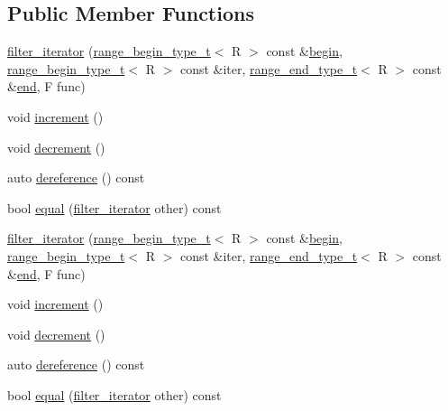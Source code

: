 \subsection*{Public Member Functions}
\begin{DoxyCompactItemize}
\item 
\mbox{\hyperlink{structrah_1_1view_1_1filter__iterator_a31543c024a816c4f3e8fc8937b2a9214}{filter\+\_\+iterator}} (\mbox{\hyperlink{namespacerah_a28aff4eeddcece6be65ff0b956d32d4a}{range\+\_\+begin\+\_\+type\+\_\+t}}$<$ R $>$ const \&\mbox{\hyperlink{namespacerah_a2c4a19e57cc4e0753e93830f247def6d}{begin}}, \mbox{\hyperlink{namespacerah_a28aff4eeddcece6be65ff0b956d32d4a}{range\+\_\+begin\+\_\+type\+\_\+t}}$<$ R $>$ const \&iter, \mbox{\hyperlink{namespacerah_a9657e24ae477f4482225b133fe286b65}{range\+\_\+end\+\_\+type\+\_\+t}}$<$ R $>$ const \&\mbox{\hyperlink{namespacerah_aaddd1442cd76b96876e692cdefe7261d}{end}}, F func)
\item 
void \mbox{\hyperlink{structrah_1_1view_1_1filter__iterator_a63278a452be5e546e6fb3aa0b1a90bfb}{increment}} ()
\item 
void \mbox{\hyperlink{structrah_1_1view_1_1filter__iterator_aed445498ffbec0c3e782ddc17314b677}{decrement}} ()
\item 
auto \mbox{\hyperlink{structrah_1_1view_1_1filter__iterator_a04ce8bb8bb607b986e692f8e39bed6e3}{dereference}} () const
\item 
bool \mbox{\hyperlink{structrah_1_1view_1_1filter__iterator_a4ab0c322842146d3011ae7c88deb82f7}{equal}} (\mbox{\hyperlink{structrah_1_1view_1_1filter__iterator}{filter\+\_\+iterator}} other) const
\item 
\mbox{\hyperlink{structrah_1_1view_1_1filter__iterator_a31543c024a816c4f3e8fc8937b2a9214}{filter\+\_\+iterator}} (\mbox{\hyperlink{namespacerah_a28aff4eeddcece6be65ff0b956d32d4a}{range\+\_\+begin\+\_\+type\+\_\+t}}$<$ R $>$ const \&\mbox{\hyperlink{namespacerah_a2c4a19e57cc4e0753e93830f247def6d}{begin}}, \mbox{\hyperlink{namespacerah_a28aff4eeddcece6be65ff0b956d32d4a}{range\+\_\+begin\+\_\+type\+\_\+t}}$<$ R $>$ const \&iter, \mbox{\hyperlink{namespacerah_a9657e24ae477f4482225b133fe286b65}{range\+\_\+end\+\_\+type\+\_\+t}}$<$ R $>$ const \&\mbox{\hyperlink{namespacerah_aaddd1442cd76b96876e692cdefe7261d}{end}}, F func)
\item 
void \mbox{\hyperlink{structrah_1_1view_1_1filter__iterator_a63278a452be5e546e6fb3aa0b1a90bfb}{increment}} ()
\item 
void \mbox{\hyperlink{structrah_1_1view_1_1filter__iterator_aed445498ffbec0c3e782ddc17314b677}{decrement}} ()
\item 
auto \mbox{\hyperlink{structrah_1_1view_1_1filter__iterator_a04ce8bb8bb607b986e692f8e39bed6e3}{dereference}} () const
\item 
bool \mbox{\hyperlink{structrah_1_1view_1_1filter__iterator_a4ab0c322842146d3011ae7c88deb82f7}{equal}} (\mbox{\hyperlink{structrah_1_1view_1_1filter__iterator}{filter\+\_\+iterator}} other) const
\end{DoxyCompactItemize}
